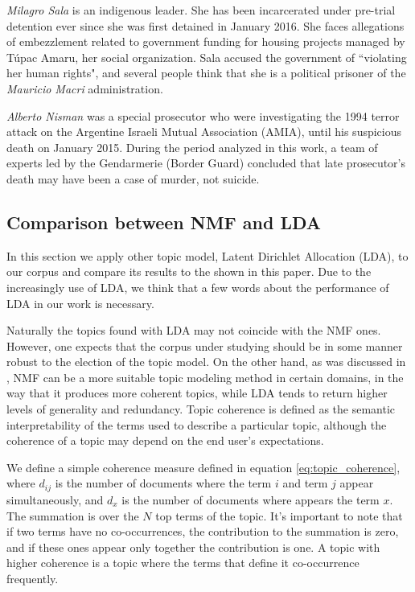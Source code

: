 \documentclass[10pt,letterpaper]{article}
\begin{document}
\par \emph{Milagro Sala} is an indigenous leader. 
She has been incarcerated under pre-trial detention ever since she was first detained in January 2016. She faces allegations of embezzlement related to government funding for housing projects managed by T\'upac Amaru, her social organization.
Sala accused the government of ``violating her human rights", and several people think that she is a political prisoner of the \emph{Mauricio Macri} administration.

\par \emph{Alberto Nisman} was a special prosecutor who were investigating the 1994 terror attack on the Argentine Israeli Mutual Association (AMIA), until his suspicious death on January 2015.
During the period analyzed in this work, a team of experts led by the Gendarmerie (Border Guard) concluded that late prosecutor's death may have been a case of murder, not suicide.


\subsection*{Comparison between NMF and LDA}

\par In this section we apply other topic model, Latent Dirichlet Allocation \cite{blei2003latent} (LDA), to our corpus and compare its results to the shown in this paper. Due to the increasingly use of LDA, we think that a few words about the performance of LDA in our work is necessary. 

\par Naturally the topics found with LDA may not coincide with the NMF ones.
However, one expects that the corpus under studying should be in some manner robust to the election of the topic model.
On the other hand, as was discussed in \cite{o2015analysis}, NMF can be a more suitable topic modeling method in certain domains, in the way that it produces more coherent topics, while LDA tends to return higher levels of generality and redundancy. Topic coherence is defined as the semantic interpretability of the terms used to describe a particular topic, although the coherence of a topic may depend on the end user's expectations.

\par We define a simple coherence measure defined in equation \ref{eq:topic_coherence}, where $d_{ij}$ is the number of documents where the term $i$ and term $j$ appear simultaneously, and $d_{x}$ is the number of documents where appears the term $x$. The summation is over the $N$ top terms of the topic.
It's important to note that if two terms have no co-occurrences, the contribution to the summation is zero, and if these ones appear only together the contribution is one.
A topic with higher coherence is a topic where the terms that define it co-occurrence frequently.
\end{document}
